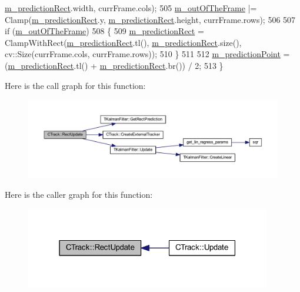 \begin{DoxyCode}
      \mbox{\hyperlink{class_c_track_aeab9c3c95a6d988918f5874a8910b90b}{m\_predictionRect}}.width, currFrame.cols);
505     \mbox{\hyperlink{class_c_track_ad97c3e53969dbb60e7690c4f2d038172}{m\_outOfTheFrame}} |= Clamp(\mbox{\hyperlink{class_c_track_aeab9c3c95a6d988918f5874a8910b90b}{m\_predictionRect}}.y, 
      \mbox{\hyperlink{class_c_track_aeab9c3c95a6d988918f5874a8910b90b}{m\_predictionRect}}.height, currFrame.rows);
506 
507     \textcolor{keywordflow}{if} (\mbox{\hyperlink{class_c_track_ad97c3e53969dbb60e7690c4f2d038172}{m\_outOfTheFrame}})
508     \{
509         \mbox{\hyperlink{class_c_track_aeab9c3c95a6d988918f5874a8910b90b}{m\_predictionRect}} = ClampWithRect(\mbox{\hyperlink{class_c_track_aeab9c3c95a6d988918f5874a8910b90b}{m\_predictionRect}}.tl(), 
      \mbox{\hyperlink{class_c_track_aeab9c3c95a6d988918f5874a8910b90b}{m\_predictionRect}}.size(), cv::Size(currFrame.cols, currFrame.rows));
510     \}
511 
512     \mbox{\hyperlink{class_c_track_a8ee3f8baaf290aeb113f34c26a446a76}{m\_predictionPoint}} = (\mbox{\hyperlink{class_c_track_aeab9c3c95a6d988918f5874a8910b90b}{m\_predictionRect}}.tl() + 
      \mbox{\hyperlink{class_c_track_aeab9c3c95a6d988918f5874a8910b90b}{m\_predictionRect}}.br()) / 2;
513 \}
\end{DoxyCode}
Here is the call graph for this function\+:\nopagebreak
\begin{figure}[H]
\begin{center}
\leavevmode
\includegraphics[width=350pt]{class_c_track_a0f4fc1dc488e8ae339e988962dae6873_cgraph}
\end{center}
\end{figure}
Here is the caller graph for this function\+:\nopagebreak
\begin{figure}[H]
\begin{center}
\leavevmode
\includegraphics[width=304pt]{class_c_track_a0f4fc1dc488e8ae339e988962dae6873_icgraph}
\end{center}
\end{figure}
\mbox{\label{class_c_track_a582c4e1ad42d5985e0f395fa5a48bdbc}} 
